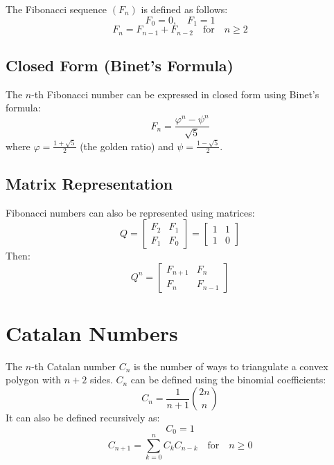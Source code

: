 \documentclass{article}
\begin{document}
The Fibonacci sequence $(F_n)$ is defined as follows:
\begin{equation}
F_0 = 0, \quad F_1 = 1
\end{equation}
\begin{equation}
F_n = F_{n-1} + F_{n-2} \quad \text{for} \quad n \geq 2
\end{equation}

\subsection{Closed Form (Binet's Formula)}

The $n$-th Fibonacci number can be expressed in closed form using Binet's formula:
\begin{equation}
F_n = \frac{\varphi^n - \psi^n}{\sqrt{5}}
\end{equation}
where $\varphi = \frac{1 + \sqrt{5}}{2}$ (the golden ratio) and $\psi = \frac{1 - \sqrt{5}}{2}$.

\subsection{Matrix Representation}

Fibonacci numbers can also be represented using matrices:
\[
Q=\begin{bmatrix}
F_2 & F_1 \\
F_1 & F_0
\end{bmatrix}
= \begin{bmatrix}
1 & 1 \\
1 & 0
\end{bmatrix}
\]
Then:
\[
Q^n=\begin{bmatrix}
F_{n+1} & F_n \\
F_n & F_{n-1}
\end{bmatrix}
\]

\section{Catalan Numbers}

The $n$-th Catalan number $C_n$ is the number of ways to triangulate a convex polygon with $n+2$ sides. $C_n$ can be defined using the binomial coefficients:
\begin{equation}
C_n = \frac{1}{n+1} \binom{2n}{n}
\end{equation}
It can also be defined recursively as:
\begin{equation}
C_0 = 1
\end{equation}
\begin{equation}
C_{n+1} = \sum_{k=0}^{n} C_k C_{n-k} \quad \text{for} \quad n \geq 0
\end{equation}
\end{document}
